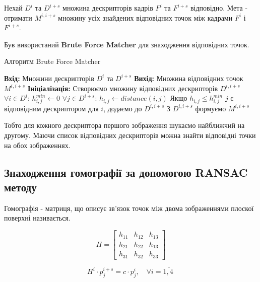 Нехай $D^i$ та $D^{i+s}$ множина дескрипторів кадрів \(F^{i}\) та \(F^{i + s}\)
відповідно. Мета - отримати \(M^{i,i+s}\) множину усіх знайдених відповідних точок  між кадрами
\(F^{i}\) і \(F^{i + s}\).


Був використаний \textbf{Brute Force Matcher} для знаходження відповідних точок.
\begin{algorithm}[H]
    \caption{Алгоритм Brute Force Matcher}
    \begin{algorithmic}
    \State \textbf{Вхід:} Множини дескрипторів $D^i$ та $D^{i+s}$
    \State \textbf{Вихід:} Множина відповідних точок \(M^{i,i+s}\)
    \State \textbf{Ініціалізація:} Створюємо множину відповідних дескрипторів $D^{i,i+s}$
    \State $\forall i \in D^i$:
    \State  \qquad $h^{min}_{i,j} \gets 0$
    \State  \qquad  $\forall j \in D^{i+s}$:
    \State  \qquad \qquad  $h_{i,j} \gets distance(i,j)$
    \State  \qquad \qquad  Якщо {$h_{i,j} \leq h^{min}_{i,j}$} 
    \State  \qquad \qquad  \qquad $j$ є відповідним  дескриптором для $i$, додаємо до  $D^{i,i+s}$
    \State З $D^{i,i+s}$ формуємо \(M^{i,i+s}\)
    \end{algorithmic}
    \label{al:brute-force-matcher}
\end{algorithm}

Тобто для кожного дескриптора першого зображення шукаємо найближчий на другому.
Маючи список відповідних дескрипторів можна знайти відповідні точки на обох зображеннях.

\subsection{Знаходження гомографії за допомогою RANSAC методу}

Гомографія - матриця, що описує зв'язок точок між двома зображеннями плоскої поверхні 
називається.

\begin{equation}
    H = 
    \begin{bmatrix}
        h_{11} & h_{12} & h_{13}\\
        h_{21} & h_{22} & h_{13}\\
        h_{31} & h_{32} & h_{33}
        \end{bmatrix}
    \label{eq:h_matrix}
\end{equation}

\begin{equation}
    H^{i} \cdot p_{j}^{i + s} = c \cdot p_{j}^{i},\quad\forall i = \overline{1,4\ }
    \label{eq:h_connection}
\end{equation}


